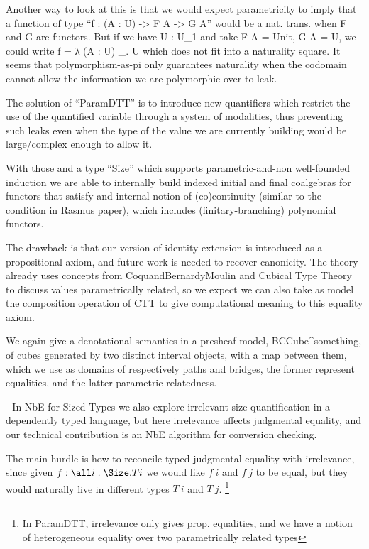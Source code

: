     Another way to look at this is that we would expect parametricity
    to imply that a function of type ``f : (A : U) -> F A -> G A''
    would be a nat. trans. when F and G are functors.  But if we have
    U : U_1 and take F A = Unit, G A = U, we could write
    f = λ (A : U) _. U which does not fit into a naturality square.
    It seems that polymorphism-as-pi only guarantees naturality when
    the codomain cannot allow the information we are polymorphic over
    to leak.

    The solution of ``ParamDTT'' is to introduce new quantifiers which
    restrict the use of the quantified variable through a system of
    modalities, thus preventing such leaks even when the type of the
    value we are currently building would be large/complex enough to
    allow it.

    With those and a type ``Size'' which supports parametric-and-non
    well-founded induction we are able to internally build indexed
    initial and final coalgebras for functors that satisfy and
    internal notion of (co)continuity (similar to the condition in
    Rasmus paper), which includes (finitary-branching) polynomial
    functors.

    The drawback is that our version of identity extension is
    introduced as a propositional axiom, and future work is needed to
    recover canonicity. The theory already uses concepts from
    CoquandBernardyMoulin and Cubical Type Theory to discuss values
    parametrically related, so we expect we can also take as model the
    composition operation of CTT to give computational meaning to this
    equality axiom.

    We again give a denotational semantics in a presheaf model,
    BCCube^\hat something, of cubes generated by two distinct interval
    objects, with a map between them, which we use as domains of
    respectively paths and bridges, the former represent equalities,
    and the latter parametric relatedness.

    
    - In NbE for Sized Types we also explore irrelevant size
    quantification in a dependently typed language, but here
    irrelevance affects judgmental equality, and our technical
    contribution is an NbE algorithm for conversion checking.
    
    The main hurdle is how to reconcile typed judgmental equality with
    irrelevance, since given $f : \all i : \Size. T i$ we would like
    $f~i$ and $f~j$ to be equal, but they would naturally live in
    different types $T~i$ and $T~j$.
    \footnote{In ParamDTT, irrelevance only gives prop. equalities,
      and we have a notion of heterogeneous equality over two
      parametrically related types}
    
